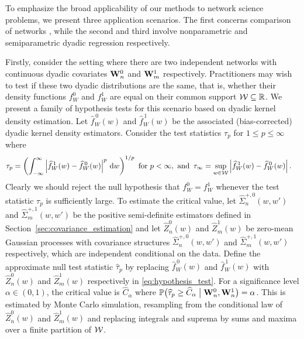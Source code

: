 To emphasize the broad applicability of our methods
to network science problems,
we present three application scenarios.
The first concerns comparison of networks
\citep{kolaczyk2009statistical},
while the second and third involve
nonparametric and semiparametric dyadic regression
respectively.

Firstly, consider the setting where there are
two independent networks with
continuous dyadic covariates $\mathbf{W}_n^0$ and $\mathbf{W}_m^1$ respectively.
Practitioners may wish to test if these two dyadic distributions
are the same, that is, whether their density functions
$f_W^0$ and $f_W^1$ are equal on their
common support $\mathcal{W} \subseteq \mathbb{R}$.
We present a family of hypothesis tests for this scenario
based on dyadic kernel density estimation.
Let $\widehat f_W^{\,0}(w)$ and $\widehat f_W^{\,1}(w)$
be the associated
(bias-corrected) dyadic kernel density estimators.
Consider the test statistics
$\tau_p$ for $1 \leq p \leq \infty$ where
%
\begin{align}
  \label{eq:hypothesis_test}
  \tau_p
  &=
  \left(
    \int_{-\infty}^{\infty}
    \left|
    \widehat f_W^{\,1}(w)
    - \widehat f_W^{\,0}(w)
    \right|^p
    \,\mathrm{d}w
  \right)^{1/p}
  \text{ for } p < \infty, \text{ and }\,
  \tau_\infty
  = \sup_{w \in \mathcal{W}}
  \left|
  \widehat f_W^{\,1}(w)
  - \widehat f_W^{\,0}(w)
  \right|.
\end{align}
%
Clearly we should reject the null hypothesis that $f_W^0 = f_W^1$ whenever
the test statistic $\tau_p$ is sufficiently large.
To estimate the critical value, let
$\widehat\Sigma_n^{+,0}(w, w')$ and $\widehat\Sigma_m^{+,1}(w, w')$
be the positive semi-definite estimators defined in
Section~\ref{sec:covariance_estimation} and
let $\widehat Z^0_n(w)$ and $\widehat Z^1_m(w)$ be zero-mean
Gaussian processes with covariance
structures $\widehat\Sigma_n^{+,0}(w, w')$
and $\widehat\Sigma_m^{+,1}(w, w')$
respectively, which are independent conditional on the data.
Define the approximate null test statistic
$\widehat \tau_p$ by replacing
$\widehat f_W^{\,0}(w)$ and $\widehat f_W^{\,1}(w)$
with $\widehat Z^0_n(w)$ and $\widehat Z^1_m(w)$ respectively
in \eqref{eq:hypothesis_test}.
For a significance level $\alpha \in (0,1)$,
the critical value is $\widehat C_\alpha$ where
%
$\mathbb{P} \big(
\widehat \tau_p \geq \widehat C_\alpha \bigm\vert \mathbf{W}_n^0, \mathbf{W}_n^1
\big) = \alpha$.
%
This is estimated by Monte Carlo simulation, resampling
from the conditional law of
$\widehat Z^0_n(w)$ and $\widehat Z^1_m(w)$
and replacing integrals and suprema by sums and maxima over a
finite partition of $\mathcal{W}$.

